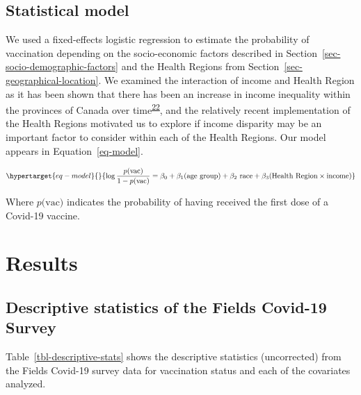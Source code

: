 \documentclass[
  letterpaper,
  DIV=11,
  numbers=noendperiod]{scrartcl}
\begin{document}
\hypertarget{statistical-model}{%
\subsection{Statistical model}\label{statistical-model}}

We used a fixed-effects logistic regression to estimate the probability
of vaccination depending on the socio-economic factors described in
Section~\ref{sec-socio-demographic-factors} and the Health Regions from
Section~\ref{sec-geographical-location}. We examined the interaction of
income and Health Region as it has been shown that there has been an
increase in income inequality within the provinces of Canada over
time\textsuperscript{\protect\hyperlink{ref-marchand2020}{22}}, and the
relatively recent implementation of the Health Regions motivated us to
explore if income disparity may be an important factor to consider
within each of the Health Regions. Our model appears in
Equation~\ref{eq-model}.

\begin{equation}\protect\hypertarget{eq-model}{}{
\log \frac{p\textrm{(vac)}}{1-p\textrm{(vac)}}= \beta_0+ \beta_{1}\textrm{(age group)} +\beta_{2} \textrm{ race} + \beta_3 \textrm{(Health Region} \times \textrm{income)} 
}\label{eq-model}\end{equation}

Where \(p\textrm{(vac)}\) indicates the probability of having received
the first dose of a Covid-19 vaccine.

\hypertarget{results}{%
\section{Results}\label{results}}

\hypertarget{descriptive-statistics-of-the-fields-covid-19-survey}{%
\subsection{Descriptive statistics of the Fields Covid-19
Survey}\label{descriptive-statistics-of-the-fields-covid-19-survey}}

Table~\ref{tbl-descriptive-stats} shows the descriptive statistics
(uncorrected) from the Fields Covid-19 survey data for vaccination
status and each of the covariates analyzed.
\end{document}
